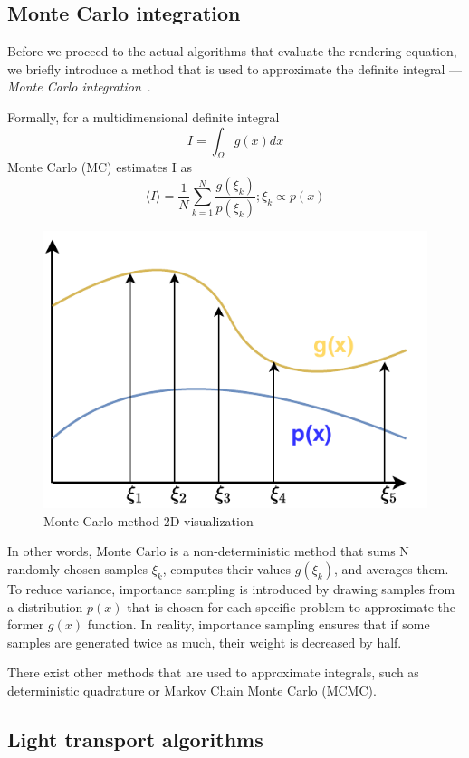 \subsection{Monte Carlo integration}
Before we proceed to the actual algorithms that evaluate the rendering equation, we briefly introduce a method that is used to approximate the definite integral --- \emph{Monte Carlo integration}~\cite{caflisch1998monte}.

Formally, for a multidimensional definite integral
\begin{equation}
I=\int_{\Omega}g(x)dx
\end{equation}
 Monte Carlo (MC) estimates I as 
 \begin{equation}
 \langle I\rangle=\frac{1}{N}\sum_{k=1}^{N}\frac{g(\xi_k)}{p(\xi_k)}; \xi_k\propto p(x)
 \end{equation}

\begin{figure}[H]
	\centering
	\includegraphics[width=0.5\linewidth]{img/monte_carlo.pdf}
	\caption{Monte Carlo method 2D visualization}
\end{figure}

In other words, Monte Carlo is a non-deterministic method that sums N randomly chosen samples $\xi_k$, computes their values $g(\xi_k)$, and averages them. To reduce variance, importance sampling is introduced by drawing samples from a distribution $p(x)$ that is chosen for each specific problem to approximate the former $g(x)$ function. In reality, importance sampling ensures that if some samples are generated twice as much, their weight is decreased by half.

There exist other methods that are used to approximate integrals, such as deterministic quadrature or Markov Chain Monte Carlo (MCMC).

\subsection{Light transport algorithms}
\label{sec:light_transport}

